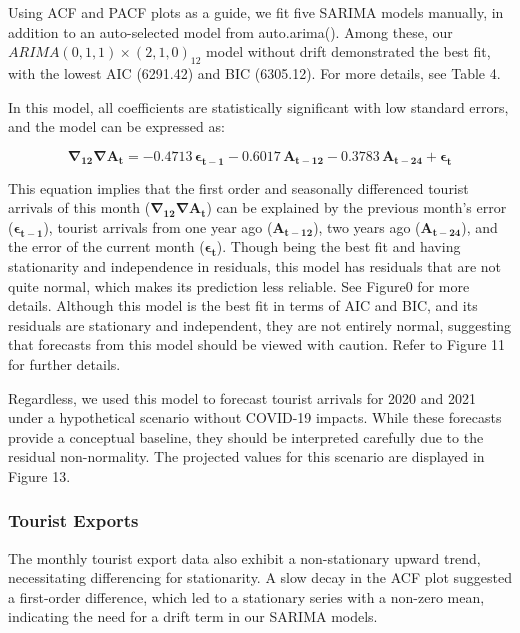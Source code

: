 \documentclass[11pt]{article}
\begin{document}
Using ACF and PACF plots as a guide, we fit five SARIMA models manually, in addition to an auto-selected model from auto.arima(). Among these, our $ARIMA(0,1,1)\times(2,1,0)_{12}$ model without drift demonstrated the best fit, with the lowest AIC (6291.42) and BIC (6305.12). For more details, see Table 4.

In this model, all coefficients are statistically significant with low standard errors, and the model can be expressed as:

\begin{equation}
\mathbf{\nabla}_{\mathbf{12}}\mathbf{\nabla}\mathbf{A}_{\mathbf{t}} = -\mathbf{0.4713}\,\mathbf{\epsilon}_{\mathbf{t-1}} - \mathbf{0.6017}\,\mathbf{A}_{\mathbf{t-12}} - \mathbf{0.3783}\,\mathbf{A}_{\mathbf{t-24}} + \mathbf{\epsilon}_{\mathbf{t}}
\end{equation}

This equation implies that the first order and seasonally differenced tourist arrivals of this month ($\mathbf{\nabla}_{\mathbf{12}}\mathbf{\nabla}\mathbf{A}_{\mathbf{t}}$) can be explained by the previous month's error ($\mathbf{\epsilon}_{\mathbf{t-1}}$), tourist arrivals from one year ago ($\mathbf{A}_{\mathbf{t-12}}$), two years ago ($\mathbf{A}_{\mathbf{t-24}}$), and the error of the current month ($\mathbf{\epsilon}_{\mathbf{t}}$). Though being the best fit and having stationarity and independence in residuals, this model has residuals that are not quite normal, which makes its prediction less reliable. See Figure0 for more details. Although this model is the best fit in terms of AIC and BIC, and its residuals are stationary and independent, they are not entirely normal, suggesting that forecasts from this model should be viewed with caution. Refer to Figure 11 for further details.

Regardless, we used this model to forecast tourist arrivals for 2020 and 2021 under a hypothetical scenario without COVID-19 impacts. While these forecasts provide a conceptual baseline, they should be interpreted carefully due to the residual non-normality. The projected values for this scenario are displayed in Figure 13.

\subsubsection{Tourist Exports}

The monthly tourist export data also exhibit a non-stationary upward trend, necessitating differencing for stationarity. A slow decay in the ACF plot suggested a first-order difference, which led to a stationary series with a non-zero mean, indicating the need for a drift term in our SARIMA models.
\end{document}
